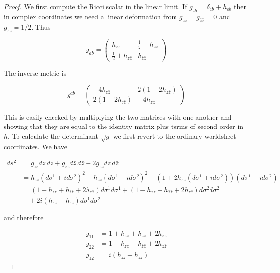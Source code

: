 \begin{tcolorbox}[breakable]
	\begin{proof}
		We first compute the Ricci scalar in the linear limit. If \( g_{ab} = \delta_{ab} + h_{ab} \) then in complex coordinates we need a linear deformation from \( g_{zz} = g_{\bar{z}\bar{z}} = 0 \) and \( g_{z\bar{z}} = 1/2 \). Thus
		
		\begin{equation}
			g_{ab} = 
			\begin{pmatrix}
				h_{zz} & \frac{1}{2} + h_{z\bar{z}} \\
				\frac{1}{2} + h_{z\bar{z}} & h_{\bar{z}\bar{z}}
			\end{pmatrix}
		\end{equation}
		
		The inverse metric is
		
		\begin{equation}
			g^{ab} = 
			\begin{pmatrix}
				-4h_{z\bar{z}} & 2(1 - 2h_{z\bar{z}}) \\
				2(1 - 2h_{z\bar{z}}) & -4h_{zz}
			\end{pmatrix}
		\end{equation}
		
		This is easily checked by multiplying the two matrices with one another and showing that they are equal to the identity matrix plus terms of second order in \( h \). To calculate the determinant \( \sqrt{g} \) we first revert to the ordinary worldsheet coordinates. We have
		
		\begin{equation}
			\begin{aligned}
				ds^2 &= g_{zz} dz \, dz + g_{\bar{z}\bar{z}} d\bar{z} \, d\bar{z} + 2g_{z\bar{z}} dz \, d\bar{z} \\
				&= h_{zz}(d\sigma^1 + id\sigma^2)^2 + h_{\bar{z}\bar{z}}(d\sigma^1 - id\sigma^2)^2 + (1 + 2h_{z\bar{z}}(d\sigma^1 + id\sigma^2))(d\sigma^1 - id\sigma^2) \\
				&= (1 + h_{zz} + h_{\bar{z}\bar{z}} + 2h_{z\bar{z}})d\sigma^1 d\sigma^1 + (1 - h_{zz} - h_{\bar{z}\bar{z}} + 2h_{z\bar{z}})d\sigma^2 d\sigma^2 \\
				&\quad + 2i(h_{zz} - h_{\bar{z}\bar{z}})d\sigma^1 d\sigma^2
			\end{aligned}
		\end{equation}
		
		and therefore
		
		\begin{align}
			g_{11} &= 1 + h_{zz} + h_{\bar{z}\bar{z}} + 2h_{z\bar{z}} \\
			g_{22} &= 1 - h_{zz} - h_{\bar{z}\bar{z}} + 2h_{z\bar{z}} \\
			g_{12} &= i(h_{zz} - h_{\bar{z}\bar{z}})
		\end{align}
		

\end{proof}
\end{tcolorbox}
